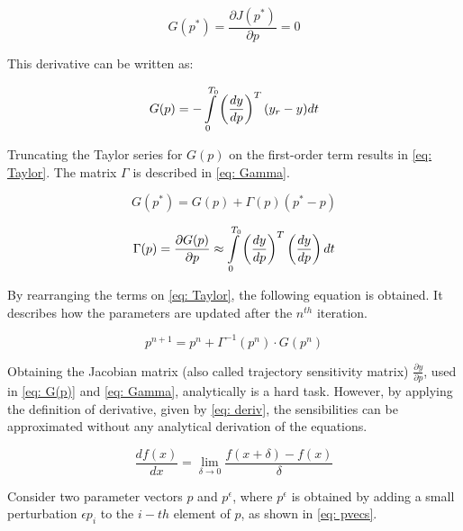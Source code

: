 \begin{equation}
	G(p^{*}) = \frac{\partial J(p^{*})}{\partial p} = 0
\end{equation}

This derivative can be written as:

\begin{equation}	
	G(p) = -\int\displaylimits_{0}^{T_{0}} \left(\frac{dy}{dp}\right)^{T} (y_{r} - y) dt
	\label{eq: G(p)}
\end{equation}

Truncating the Taylor series for $G(p)$ on the first-order term results in \eqref{eq: Taylor}. The matrix $\Gamma$ is described in \eqref{eq: Gamma}.

\begin{equation}
	G(p^{*}) = G(p) + \Gamma (p)(p^{*} - p)
	\label{eq: Taylor}
\end{equation}

\begin{equation}
	\Gamma (p) = \frac{\partial G(p)}{\partial p} \approx \int\displaylimits_{0}^{T_{0}} \left(\frac{dy}{dp}\right)^{T} \left(\frac{dy}{dp}\right) dt
	\label{eq: Gamma}
\end{equation}

By rearranging the terms on \eqref{eq: Taylor}, the following equation is obtained. It describes how the parameters are updated after the $n^{th}$ iteration.

\begin{equation}
	p^{n+1} = p^{n} + \Gamma^{-1}(p^{n})\cdot G(p^{n})
\end{equation}

Obtaining the Jacobian matrix (also called trajectory sensitivity matrix) $\frac{\partial y}{\partial p}$, used in \eqref{eq: G(p)} and \eqref{eq: Gamma}, analytically is a hard task. However, by applying the definition of derivative, given by \eqref{eq: deriv}, the sensibilities can be approximated without any analytical derivation of the equations.

\begin{equation}
	\frac{df(x)}{dx} = \lim\limits_{\delta \to 0} \frac{f(x + \delta) - f(x)}{\delta}
	\label{eq: deriv}
\end{equation}

Consider two parameter vectors $p$ and $p^{\epsilon}$, where $p^{\epsilon}$ is obtained by adding a small perturbation $\epsilon p_{i}$ to the $i-th$ element of $p$, as shown in \eqref{eq: pvecs}.

